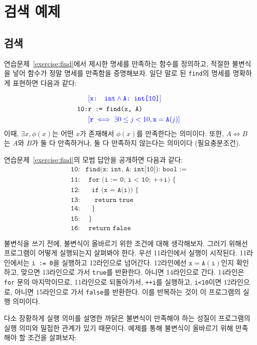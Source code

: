 \documentclass{oblivoir}
\theoremstyle{definition}
\newcommand{\inv}[1]{\textcolor{blue}{\ensuremath{[{#1}]}}}
\begin{document}
\section{검색 예제}
\subsection{검색}
연습문제~\ref{exercise:find}에서 제시한 명세를 만족하는 함수를
정의하고, 적절한 불변식을 넣어 함수가 정말 명세를 만족함을 증명해보자.
일단 말로 된 \texttt{find}의 명세를 명확하게 표현하면 다음과 같다:

\begin{align*}
  & \inv{\texttt{x: int} \land \texttt{A: int[10]}} \\
  \texttt{10:}& \texttt{r := find(x, A)} \\
  & \inv{\texttt{r} \iff \exists 0\leq j<10, \texttt{x}=\texttt{A}(j)}
\end{align*}
\noindent 이때, $\exists x, \phi(x)$는 어떤 $x$가 존재해서 $\phi(x)$를
만족한다는 의미이다.  또한, $A \iff B$는 $A$와 $B$가 둘 다 만족하거나,
둘 다 만족하지 않는다는 의미이다 (필요충분조건).

연습문제~\ref{exercise:find}의 모범 답안을 공개하면 다음과 같다:
\begin{align*}
\texttt{10:}& \texttt{find(x: int, A: int[10]): bool :=} \\
\texttt{11:}& \ \ \texttt{for (i := 0; i < 10; ++i) \{} \\
\texttt{12:}& \ \ \ \ \texttt{if (x = A(i)) \{} \\
\texttt{13:}& \ \ \ \ \ \ \texttt{return true} \\
\texttt{14:}& \ \ \ \ \texttt{\}} \\
\texttt{15:}& \ \ \texttt{\}} \\
\texttt{16:}& \ \ \texttt{return false}
\end{align*}

불변식을 쓰기 전에, 불변식이 올바르기 위한 조건에 대해 생각해보자.
그러기 위해선 프로그램이 어떻게 실행되는지 살펴봐야 한다.  우선
11라인에서 실행이 시작된다.  11라인에서는 \texttt{i := 0}을 실행하고
12라인으로 넘어간다.  12라인에선
$\texttt{x}=\texttt{A}(\texttt{i})$인지 확인하고, 맞으면 13라인으로
가서 \texttt{true}를 반환한다.  아니면 14라인으로 간다.  14라인은
\texttt{for} 문의 마지막이므로, 11라인으로 되돌아가서, \texttt{++i}를
실행하고, \texttt{i<10}이면 12라인으로, 아니면 15라인으로 가서
\texttt{false}를 반환한다.  이를 반복하는 것이 이 프로그램의 실행
의미이다.

다소 장황하게 실행 의미를 설명한 까닭은 불변식이 만족해야 하는 성질이
프로그램의 실행 의미와 밀접한 관계가 있기 때문이다.  예제를 통해
불변식이 올바르기 위해 만족해야 할 조건을 살펴보자:
\end{document}
